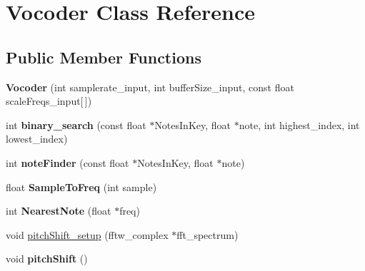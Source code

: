 \hypertarget{classVocoder}{\section{Vocoder Class Reference}
\label{classVocoder}
}
\subsection*{Public Member Functions}
\begin{DoxyCompactItemize}
\item 
\hypertarget{classVocoder_a561d0fe4ba2d6cea47405648a8c14e32}{{\bfseries Vocoder} (int samplerate\-\_\-input, int buffer\-Size\-\_\-input, const float scale\-Freqs\-\_\-input\mbox{[}$\,$\mbox{]})}\label{classVocoder_a561d0fe4ba2d6cea47405648a8c14e32}

\item 
\hypertarget{classVocoder_aaa67580c520b3714584dbebcc63ccbec}{int {\bfseries binary\-\_\-search} (const float $\ast$Notes\-In\-Key, float $\ast$note, int highest\-\_\-index, int lowest\-\_\-index)}\label{classVocoder_aaa67580c520b3714584dbebcc63ccbec}

\item 
\hypertarget{classVocoder_a477a2c5170d9e513b582769dace8fddf}{int {\bfseries note\-Finder} (const float $\ast$Notes\-In\-Key, float $\ast$note)}\label{classVocoder_a477a2c5170d9e513b582769dace8fddf}

\item 
\hypertarget{classVocoder_a6ac34c186396037e8546fd03b5a0b51a}{float {\bfseries Sample\-To\-Freq} (int sample)}\label{classVocoder_a6ac34c186396037e8546fd03b5a0b51a}

\item 
\hypertarget{classVocoder_a82f956fd497e7f1b21b0fed6647f2281}{int {\bfseries Nearest\-Note} (float $\ast$freq)}\label{classVocoder_a82f956fd497e7f1b21b0fed6647f2281}

\item 
void \hyperlink{classVocoder_a205b461f0bf7c3b1ffb0b8a89ccd5e72}{pitch\-Shift\-\_\-setup} (fftw\-\_\-complex $\ast$fft\-\_\-spectrum)
\item 
\hypertarget{classVocoder_a31c2f03502edb92a86ce799fbf4957f6}{void {\bfseries pitch\-Shift} ()}\label{classVocoder_a31c2f03502edb92a86ce799fbf4957f6}

\end{DoxyCompactItemize}
